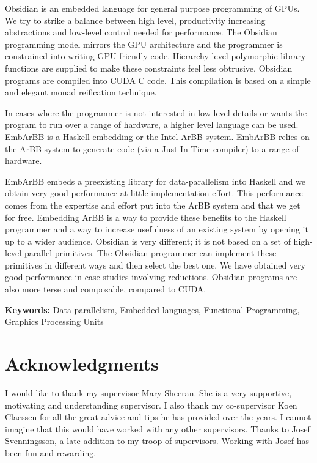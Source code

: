 \documentclass[a4paper]{book}
\begin{document}
Obsidian is an embedded language for general purpose programming of GPUs. We try to strike 
a balance between high level, productivity increasing abstractions and low-level 
control needed for performance. The Obsidian programming model mirrors the GPU architecture 
and the programmer is constrained into writing GPU-friendly code. Hierarchy level 
polymorphic library functions are supplied to make these constraints feel less obtrusive. 
Obsidian programs are compiled into CUDA C code. This compilation is based on a simple 
and elegant monad reification technique.  

In cases where the programmer is not interested in low-level details 
or wants the program to run over a range of hardware, a higher level language can be used.
EmbArBB is a Haskell embedding or the Intel ArBB system. EmbArBB relies on the ArBB system 
to generate code (via a Just-In-Time compiler) to a range of hardware. 

EmbArBB embeds a preexisting library for data-parallelism into Haskell and we obtain 
very good performance at little implementation effort. This performance comes from the 
expertise and effort put into the ArBB system and that we get for free. Embedding ArBB is 
a way to provide these benefits to the Haskell programmer and a way to increase usefulness
of an existing system by opening it up to a wider audience. Obsidian is very different; it 
is not based on a set of high-level parallel primitives. The Obsidian programmer 
can implement these primitives in different ways and then select the best one. 
We have obtained very good performance in case studies involving reductions. Obsidian 
programs are also more terse and composable, compared to CUDA. 
 
\vspace{5mm}

\noindent

\textbf{Keywords:} Data-parallelism, Embedded languages, Functional Programming, Graphics Processing Units

\clearpage

\section*{Acknowledgments}

I would like to thank my supervisor Mary Sheeran. She is a very supportive, motivating and 
understanding supervisor. I also thank my co-supervisor Koen Claessen for all the great advice 
and tips he has provided over the years. I cannot imagine that this would have worked with 
any other supervisors. Thanks to Josef Svenningsson, a late addition to my troop of 
supervisors. Working with Josef has been fun and rewarding. 
\end{document}
